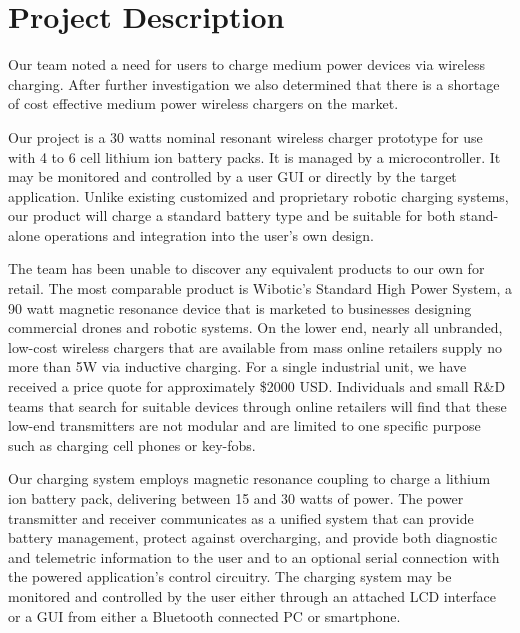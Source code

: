 \documentclass[12pt]{article}
\begin{document}
\section{Project Description}
\indent \indent
Our team noted a need for users to charge medium power devices via wireless charging.  After further investigation we also determined that there is a shortage of cost effective medium power wireless chargers on the market.\\ \indent

Our project is a 30 watts nominal resonant wireless charger prototype for use with 4 to 6 cell lithium ion battery packs. It is managed by a microcontroller. It may be monitored and controlled by a user GUI or directly by the target application. Unlike existing customized and proprietary robotic charging systems, our product will charge a standard battery type and be suitable for both stand-alone operations and integration into the user's own design.\\ \indent

The team has been unable to discover any equivalent products to our own for retail. The most comparable product is Wibotic's Standard High Power System\cite{WiboSHPS}, a 90 watt magnetic resonance device that is marketed to businesses designing commercial drones and robotic systems. On the lower end, nearly all unbranded, low-cost wireless chargers that are available from mass online retailers supply no more than 5W via inductive charging. For a single industrial unit, we have received a price quote for approximately \$2000 USD. Individuals and small R\&D teams that search for suitable devices through online retailers will find that these low-end transmitters are not modular and are limited to one specific purpose such as charging cell phones or key-fobs.\\ \indent

Our charging system employs magnetic resonance coupling to charge a lithium ion battery pack, delivering between 15 and 30 watts of power. The power transmitter and receiver communicates as a unified system that can provide battery management, protect against overcharging, and provide both diagnostic and telemetric information to the user and to an optional serial connection with the powered application’s control circuitry. The charging system may be monitored and controlled by the user either through an attached LCD interface or a GUI from either a Bluetooth connected PC or smartphone.\\ \indent
\end{document}
